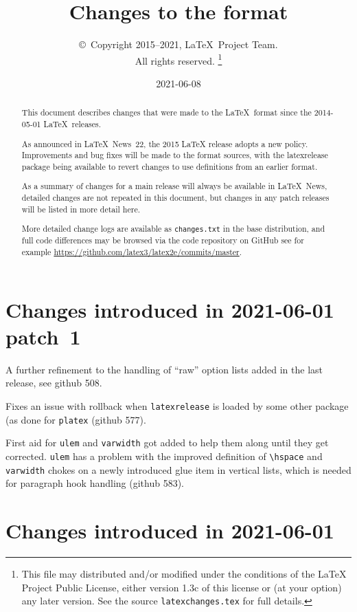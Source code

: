 \documentclass{ltxguide}
\title{Changes to the \LaTeXe{} format}
\author{\copyright~Copyright 2015--2021, \LaTeX\ Project Team.\\
   All rights reserved.%
   \footnote{This file may distributed and/or modified under the
     conditions of the \LaTeX{} Project Public License, either version 1.3c
     of this license or (at your option) any later version. See the source
    \texttt{latexchanges.tex} for full details.}%
}
\date{2021-06-08}
\newcommand\Lpack[1]{\mbox{\textsf{#1}}}
\newcommand\pkg[1]{\texttt{#1}}
\newcommand\cs[1]{\texttt{\textbackslash #1}}
\newcommand\ghissue[1]{github #1}
\newcommand\ltnewsissue[1]{\LaTeX\ News~#1}
\newcommand\ghissue[1]{%
    \href{https://github.com/latex3/latex2e/issues/#1}{github #1}}
\newcommand\ltnewsissue[1]{%
    \href{https://www.latex-project.org/news/latex2e-news/ltnews#1.pdf}{\LaTeX\ News~#1}}
\begin{document}
\maketitle

\begin{abstract}
This document describes changes that were made to the
\LaTeX\ format since the  2014-05-01 \LaTeX\ releases.


As announced in \ltnewsissue{22}, the 2015 \LaTeX{} release adopts a new
policy. Improvements and bug fixes will be made to the format sources,
with the \Lpack{latexrelease} package being available to revert
changes to use definitions from an earlier format.

As a summary of changes for a main release will always be available in
\LaTeX\ News, detailed changes are not repeated in this document,
but changes in any patch releases will be listed in more
detail here.

More detailed change logs are available as
\texttt{changes.txt} in the base distribution, and full code
  differences may be browsed via the code repository on GitHub
see for example
\url{https://github.com/latex3/latex2e/commits/master}.
\end{abstract}

\tableofcontents

\newpage


\section{Changes introduced in 2021-06-01 patch~1}

A further refinement to the handling of ``raw'' option lists added
in the last release, see \ghissue{508}.

Fixes an issue with rollback when \pkg{latexrelease} is loaded by some
other package (as done for \texttt{platex} (\ghissue{577}).

First aid for \pkg{ulem} and \pkg{varwidth} got added to help them
along until they get corrected. \pkg{ulem} has a problem with the
improved definition of \cs{hspace} and \pkg{varwidth} chokes on a
newly introduced glue item in vertical lists, which is needed for
paragraph hook handling (\ghissue{583}).


\section{Changes introduced in 2021-06-01}
\end{document}
